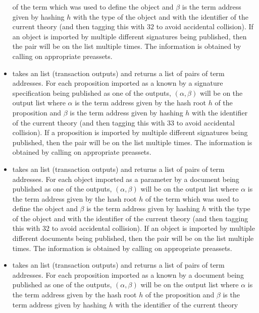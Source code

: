 \begin{itemize}
of the term which was used to define the object
and $\beta$ is the term address given by hashing $h$ with the type of the object and with the identifier of the current theory
(and then tagging this with $32$ to avoid accidental collision).
If an object is imported by multiple
different signatures being published, then the pair will be on the list multiple times.
The information is obtained by calling {} on appropriate preassets.
\item {} takes
an {} list (transaction outputs)
and returns a list of pairs of term addresses.
For each proposition imported as a known by a signature specification being published as one of the outputs,
$(\alpha,\beta)$ will be on the output list
where $\alpha$ is the term address given by the hash root $h$
of the proposition
and $\beta$ is the term address given by hashing $h$ with the identifier of the current theory
(and then tagging this with $33$ to avoid accidental collision).
If a proposition is imported by multiple
different signatures being published, then the pair will be on the list multiple times.
The information is obtained by calling {} on appropriate preassets.
\item {} takes
an {} list (transaction outputs)
and returns a list of pairs of term addresses.
For each object imported as a parameter by a document being published as one of the outputs,
$(\alpha,\beta)$ will be on the output list
where $\alpha$ is the term address given by the hash root $h$
of the term which was used to define the object
and $\beta$ is the term address given by hashing $h$ with the type of the object and with the identifier of the current theory
(and then tagging this with $32$ to avoid accidental collision).
If an object is imported by multiple
different documents being published, then the pair will be on the list multiple times.
The information is obtained by calling {} on appropriate preassets.
\item {} takes
an {} list (transaction outputs)
and returns a list of pairs of term addresses.
For each proposition imported as a known by a document being published as one of the outputs,
$(\alpha,\beta)$ will be on the output list
where $\alpha$ is the term address given by the hash root $h$
of the proposition
and $\beta$ is the term address given by hashing $h$ with the identifier of the current theory

\end{itemize}
